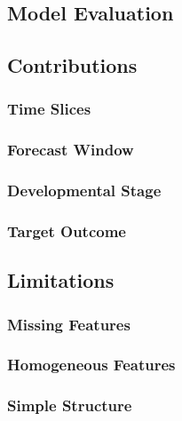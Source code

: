 \documentclass[../thesis/thesis.tex]{subfiles}
\begin{document}
\begin{enumerate}
\section{Model Evaluation} %

\subsection{Contributions} %

\subsubsection{Time Slices} %
\subsubsection{Forecast Window} %
\subsubsection{Developmental Stage} %
\subsubsection{Target Outcome} %

\subsection{Limitations} %

\subsubsection{Missing Features} %
\subsubsection{Homogeneous Features} %
\subsubsection{Simple Structure} %

\end{enumerate}

\end{document}
